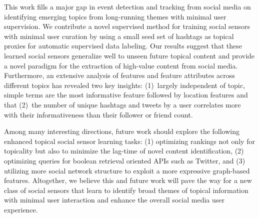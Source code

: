 This work fills a major gap in event detection and tracking from
social media on identifying emerging topics from long-running themes
with minimal user supervision.  We contribute a novel supervised
method for training social sensors with minimal user curation by using
a small seed set of hashtags as topical proxies for automatic
supervised data labeling.
Our results suggest that these learned social sensors generalize well
to unseen future topical content and provide a novel paradigm for the
extraction of high-value content from social media. Furthermore, an
extensive analysis of features and feature attributes across different
topics has revealed two key insights: (1)~largely independent of
topic, simple terms are the most informative feature followed by
location features and that (2)~the number of unique hashtags and
tweets by a user correlates more with their informativeness than their
follower or friend count.

Among many interesting directions, future work should explore the
following enhanced topical social sensor learning tasks: (1)
optimizing rankings not only for topicality but also to minimize the
lag-time of novel content identification, (2) optimizing queries for
boolean retrieval oriented APIs such as Twitter, and (3) utilizing
more social network structure to exploit a more expressive graph-based
features.  Altogether, we believe this and future work will pave
the way for a new class of social sensors that learn to
identify broad themes of topical information with minimal user
interaction and enhance the overall social media user experience.
